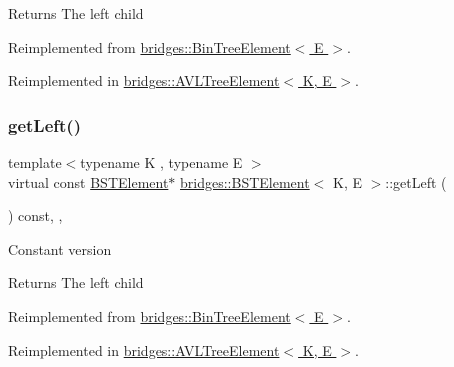 \begin{DoxyReturn}{Returns}
The left child 
\end{DoxyReturn}


Reimplemented from \hyperlink{classbridges_1_1_bin_tree_element_a8367ce9c4eea814637edc2c56efbde25}{bridges\+::\+Bin\+Tree\+Element$<$ E $>$}.



Reimplemented in \hyperlink{classbridges_1_1_a_v_l_tree_element_a7b5d05660da127f5f6164120d9846d90}{bridges\+::\+A\+V\+L\+Tree\+Element$<$ K, E $>$}.

\hypertarget{classbridges_1_1_b_s_t_element_a2abcfb991f6cc377da2bd9217319fc9c}{}\label{classbridges_1_1_b_s_t_element_a2abcfb991f6cc377da2bd9217319fc9c} 
\subsubsection{\texorpdfstring{get\+Left()}{getLeft()}\hspace{0.1cm}{\footnotesize\ttfamily [2/2]}}
{\footnotesize\ttfamily template$<$typename K , typename E $>$ \\
virtual const \hyperlink{classbridges_1_1_b_s_t_element}{B\+S\+T\+Element}$\ast$ \hyperlink{classbridges_1_1_b_s_t_element}{bridges\+::\+B\+S\+T\+Element}$<$ K, E $>$\+::get\+Left (\begin{DoxyParamCaption}{ }\end{DoxyParamCaption}) const\hspace{0.3cm}{\ttfamily [inline]}, {\ttfamily [override]}, {\ttfamily [virtual]}}

Constant version

\begin{DoxyReturn}{Returns}
The left child 
\end{DoxyReturn}


Reimplemented from \hyperlink{classbridges_1_1_bin_tree_element_a0841701bd7d4b444dafbbdfefed067a5}{bridges\+::\+Bin\+Tree\+Element$<$ E $>$}.



Reimplemented in \hyperlink{classbridges_1_1_a_v_l_tree_element_a61e075db5414b7bd6f52d657401acda3}{bridges\+::\+A\+V\+L\+Tree\+Element$<$ K, E $>$}.

\hypertarget{classbridges_1_1_b_s_t_element_a7c177dc3d3ff942d6d534e1dfcbfee00}{}\label{classbridges_1_1_b_s_t_element_a7c177dc3d3ff942d6d534e1dfcbfee00} 
